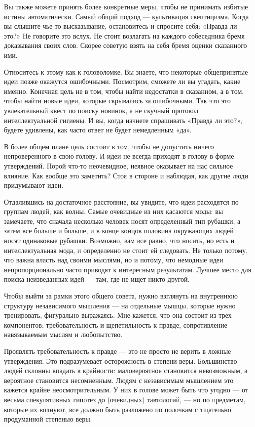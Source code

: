 \documentclass[ebook,12pt,oneside,openany]{memoir}
\begin{document}
Вы также можете принять более конкретные меры, чтобы не принимать
избитые истины автоматически. Самый общий подход — культивация
скептицизма. Когда вы слышите чье-то высказывание, остановитесь и
спросите себя: «Правда ли это?» Не говорите это вслух. Не стоит
возлагать на каждого собеседника бремя доказывания своих слов. Скорее
советую взять на себя бремя оценки сказанного ими.

Относитесь к этому как к головоломке. Вы знаете, что некоторые
общепринятые идеи позже окажутся ошибочными. Посмотрим, сможете ли вы
угадать, какие именно. Конечная цель не в том, чтобы найти недостатки
в сказанном, а в том, чтобы найти новые идеи, которые скрывались за
ошибочными. Так что это увлекательный квест по поиску новинок, а не
скучный протокол интеллектуальной гигиены. И вы, когда начнете
спрашивать «Правда ли это?», будете удивлены, как часто ответ не будет
немедленным «да».

В более общем плане цель состоит в том, чтобы не допустить ничего
непроверенного в свою голову. И идеи не всегда приходят в голову в
форме утверждений. Порой что-то неочевидное, неявное оказывает на нас
сильное влияние. Как вообще это заметить? Стоя в стороне и наблюдая,
как другие люди придумывают идеи.

Отдалившись на достаточное расстояние, вы увидите, что идеи расходятся
по группам людей, как волны. Самые очевидные из них касаются моды: вы
замечаете, что сначала несколько человек носят определенный тип
рубашки, а затем все больше и больше, и в конце концов половина
окружающих людей носят одинаковые рубашки. Возможно, вам все равно,
что носить, но есть и интеллектуальная мода, и определенно не стоит ей
следовать. Не только потому, что важна власть над своими мыслями, но и
потому, что немодные идеи непропорционально часто приводят к
интересным результатам. Лучшее место для поиска неизведанных идей —
там, где не ищет никто другой.

Чтобы выйти за рамки этого общего совета, нужно взглянуть на
внутреннюю структуру независимого мышления — на отдельные мышцы,
которые нужно тренировать, фигурально выражаясь. Мне кажется, что она
состоит из трех компонентов: требовательность и щепетильность к
правде, сопротивление навязываемым мыслям и любопытство.

Проявлять требовательность к правде — это не просто не верить в ложные
утверждения. Это подразумевает осторожность в степени веры.
Большинство людей склонны впадать в крайности: маловероятное
становится невозможным, а вероятное становится несомненным. Людям с
независимым мышлением это кажется крайне неосмотрительным. У них в
голове может быть что угодно — от весьма спекулятивных гипотез до
(очевидных) тавтологий, — но по предметам, которые их волнуют, все
должно быть разложено по полочкам с тщательно продуманной степенью
веры.
\end{document}
